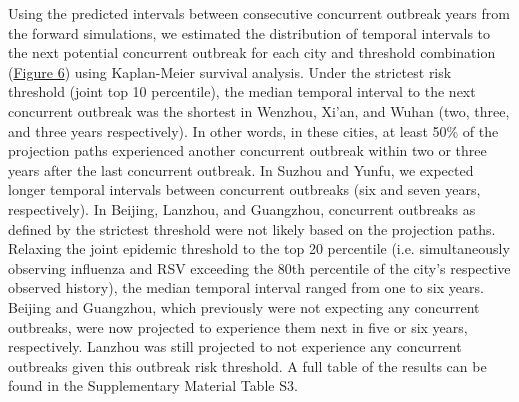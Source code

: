 Using the predicted intervals between consecutive concurrent outbreak years from the forward simulations, we estimated the distribution of temporal intervals to the next potential concurrent outbreak for each city and threshold combination (\hyperref[fig:fig6]{Figure 6}) using Kaplan-Meier survival analysis. 
Under the strictest risk threshold (joint top 10 percentile), the median temporal interval to the next concurrent outbreak was the shortest in Wenzhou, Xi'an, and Wuhan (two, three, and three years respectively).
In other words, in these cities, at least 50\% of the projection paths experienced another concurrent outbreak within two or three years after the last concurrent outbreak.
In Suzhou and Yunfu, we expected longer temporal intervals between concurrent outbreaks (six and seven years, respectively).
In Beijing, Lanzhou, and Guangzhou, concurrent outbreaks as defined by the strictest threshold were not likely based on the projection paths.
Relaxing the joint epidemic threshold to the top 20 percentile (i.e. simultaneously observing influenza and RSV exceeding the 80th percentile of the city's respective observed history), the median temporal interval ranged from one to six years.
Beijing and Guangzhou, which previously were not expecting any concurrent outbreaks, were now projected to experience them next in five or six years, respectively.
Lanzhou was still projected to not experience any concurrent outbreaks given this outbreak risk threshold.
A full table of the results can be found in the Supplementary Material Table S3.